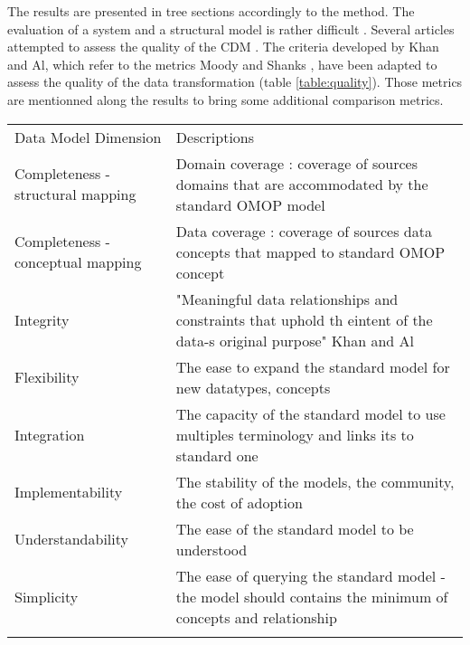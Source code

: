 
The results are presented in tree sections accordingly to the method. The
evaluation of a system and a structural model is rather difficult
\cite{moody-quality}. Several articles attempted to assess the quality of the
CDM \cite{kahn_data_2012,omop-vs-pcornet}. The criteria developed by Khan and
Al\cite{khan-quality}, which refer to the metrics Moody and Shanks
\cite{moody-quality}, have been adapted to assess the quality of the data
transformation (table \ref{table:quality}). Those metrics are mentionned along
the results to bring some additional comparison metrics.

\tiny
\begin{table*}[t]
\caption{Data Transformation Quality Evaluation Metrics}
\begin{tabular}{@{}ll@{}}\toprule
Data Model Dimension              & Descriptions                                                                                                      \\\colrule
Completeness - structural mapping & Domain coverage : coverage of sources domains that are accommodated by the standard OMOP model                    \\
Completeness - conceptual mapping & Data coverage : coverage of sources data concepts that mapped to standard OMOP concept                            \\
Integrity                         & "Meaningful data relationships and constraints that uphold th eintent of the data-s original purpose" Khan and Al \\
Flexibility                       & The ease to expand the standard model for new datatypes, concepts                                                 \\
Integration                       & The capacity of the standard model to use multiples terminology and links its to standard one                     \\
Implementability                  & The stability of the models, the community, the cost of adoption                                                  \\
Understandability                 & The ease of the standard model to be understood                                                           	      \\
Simplicity                        & The ease of querying the standard model - the model should contains the minimum of concepts and relationship      \\\botrule 
\end{tabular}
\label{table:quality}
\end{table*}
\normalsize

